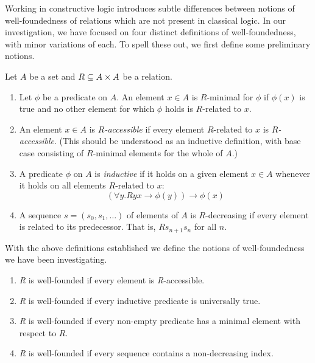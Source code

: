 \documentclass{scrartcl}
\begin{document}
Working in constructive logic introduces subtle differences between notions of well-foundedness of relations
which are not present in classical logic.  In our investigation, we have focused on four distinct definitions of well-foundedness, with minor variations of each. To spell these out, we first define some preliminary notions.

\begin{dfn} Let $A$ be a set and $R \subseteq A \times A$ be a relation.
\begin{enumerate}
  \item Let $\phi$ be a predicate on $A$. An element $x \in A$ is $R$-minimal for $\phi$ if $\phi(x)$ is true and no other element for which $\phi$ holds is $R$-related to $x$.
  \item An element $x \in A$ is \textit{$R$-accessible} if every element $R$-related to $x$ is \textit{$R$-accessible}.  (This should be understood as an inductive definition, with base case consisting of $R$-minimal elements for the whole of $A$.)
    \item A predicate $\phi$ on $A$ is \emph{inductive} if it holds on a given element $x \in A$ whenever it holds on all elements $R$-related to $x$:
    \[ (\forall y. Ryx \to \phi(y)) \to \phi(x) \]
    \item A sequence $s = (s_0,s_1,\dots)$ of elements of $A$ is $R$-decreasing
    if every element is related to its predecessor.  That is, $Rs_{n+1}s_n$ for all $n$.
\end{enumerate}
\end{dfn}
With the above definitions established we define the notions of well-foundedness we have been investigating.
\begin{dfn} \hfil
  \begin{enumerate}
    \item \textit{R} is well-founded if every element is \textit{R}-accessible.
    \item \textit{R} is well-founded if every inductive predicate is universally true.
    \item \textit{R} is well-founded if every non-empty predicate has a minimal element with respect to $R$.
    \item \textit{R} is well-founded if every sequence contains a non-decreasing index.
  \end{enumerate}
\end{dfn}
\end{document}
